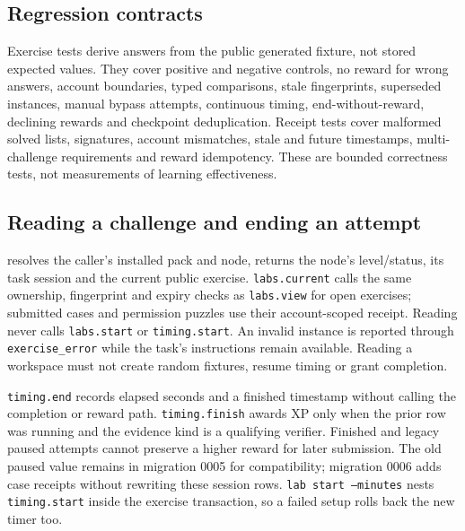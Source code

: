 \subsection{Regression contracts}
Exercise tests derive answers from the public generated fixture, not stored expected
values. They cover positive and negative controls, no reward for wrong answers,
account boundaries, typed comparisons, stale fingerprints, superseded instances,
manual bypass attempts, continuous timing, end-without-reward, declining rewards and checkpoint deduplication.
Receipt tests cover malformed solved lists, signatures, account mismatches, stale
and future timestamps, multi-challenge requirements and reward idempotency. These
are bounded correctness tests, not measurements of learning effectiveness.

\subsection{Reading a challenge and ending an attempt}
 resolves the caller's installed pack and node,
returns the node's level/status, its task session and the current public exercise.
\texttt{labs.current} calls the same ownership, fingerprint and expiry checks as
\texttt{labs.view} for open exercises; submitted cases and permission puzzles use their account-scoped
receipt. Reading never calls \texttt{labs.start} or \texttt{timing.start}.
An invalid instance is reported through \texttt{exercise\_error} while the task's
instructions remain available. Reading a workspace must not create random fixtures,
resume timing or grant completion.

\texttt{timing.end} records elapsed seconds and a finished timestamp without
calling the completion or reward path. \texttt{timing.finish} awards XP only when
the prior row was running and the evidence kind is a qualifying verifier. Finished
and legacy paused attempts cannot preserve a higher reward for later submission.
The old paused value remains in migration 0005 for compatibility; migration 0006
adds case receipts without rewriting these session rows. \texttt{lab start --minutes} nests \texttt{timing.start}
inside the exercise transaction, so a failed setup rolls back the new timer too.
